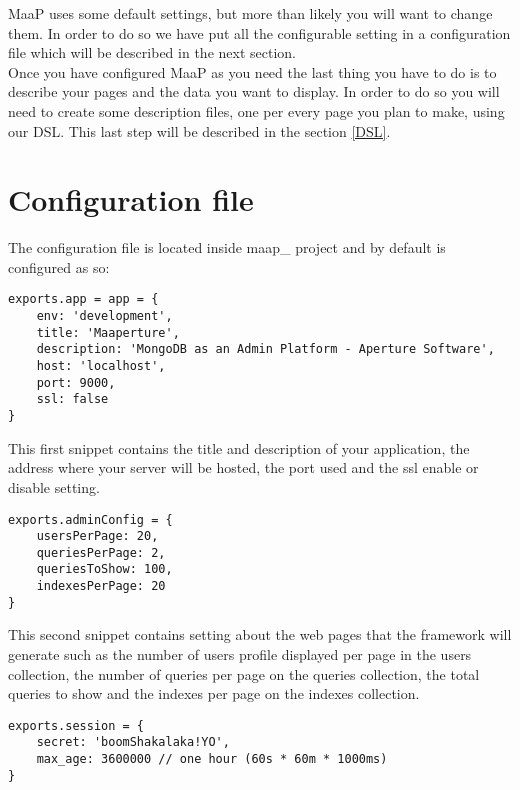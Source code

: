 MaaP uses some default settings, but more than likely you will want to change them. In order to do so we have put all the configurable setting in a configuration file which will be described in the next section.\\

Once you have configured MaaP as you need the last thing you have to do is to describe your pages and the data you want to display.
In order to do so you will need to create some description files, one per every page you plan to make, using our DSL.
This last step will be described in the section \ref{DSL}.\\




\newpage
\section{Configuration file}

The configuration file is located inside   maap\_ project and by default is configured as so:\\


\begin{lstlisting}
exports.app = app = {
	env: 'development',
	title: 'Maaperture',
	description: 'MongoDB as an Admin Platform - Aperture Software',
	host: 'localhost',
	port: 9000,
	ssl: false
}

\end{lstlisting}

This first snippet contains the title and description of your application, the address where your server will be hosted, the port used and the ssl enable or disable setting.\\

\begin{lstlisting}
exports.adminConfig = {
	usersPerPage: 20,
	queriesPerPage: 2,
	queriesToShow: 100,
	indexesPerPage: 20
}
\end{lstlisting}

This second snippet contains setting about the web pages that the framework will generate such as the number of users profile displayed per page in the users collection, the number of queries per page on the queries collection, the total queries to show and the indexes per page on the indexes collection.\\

\begin{lstlisting}
exports.session = {
	secret: 'boomShakalaka!YO',
	max_age: 3600000 // one hour (60s * 60m * 1000ms)
}
\end{lstlisting}


